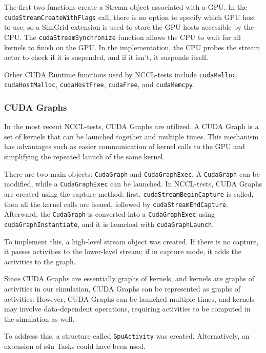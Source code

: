 \documentclass[11pt,a4paper]{article}
\begin{document}
The first two functions create a Stream object associated with a GPU. In the 
\texttt{cudaStreamCreateWithFlags} call, there is no option to specify which 
GPU \gls{host} to use, so a SimGrid extension is used to store the GPU \glspl{host} 
accessible by the CPU. The \texttt{cudaStreamSynchronize} function allows the CPU 
to wait for all kernels to finish on the GPU. In the implementation, the CPU probes 
the stream actor to check if it is suspended, and if it isn't, it suspends itself.

Other CUDA Runtime functions used by NCCL-tests include \texttt{cudaMalloc}, 
\texttt{cudaHostMalloc}, \texttt{cudaHostFree}, \texttt{cudaFree}, and \texttt{cudaMemcpy}.

\subsubsection{CUDA Graphs}
In the most recent NCCL-tests, CUDA Graphs are utilized. A CUDA Graph is a set 
of kernels that can be launched together and multiple times. This mechanism has 
advantages such as easier communication of kernel calls to the GPU and simplifying 
the repeated launch of the same kernel.

There are two main objects: \texttt{CudaGraph} and \texttt{CudaGraphExec}. A 
\texttt{CudaGraph} can be modified, while a \texttt{CudaGraphExec} can be launched. 
In NCCL-tests, CUDA Graphs are created using the capture method: first, 
\texttt{cudaStreamBeginCapture} is called, then all the kernel calls are issued, 
followed by \texttt{cudaStreamEndCapture}. Afterward, the \texttt{CudaGraph} is 
converted into a \texttt{CudaGraphExec} using \texttt{cudaGraphInstantiate}, and 
it is launched with \texttt{cudaGraphLaunch}.

To implement this, a high-level stream object was created. If there is no capture, 
it passes activities to the lower-level stream; if in capture mode, it adds the 
activities to the graph.

Since CUDA Graphs are essentially graphs of kernels, and kernels are graphs of 
activities in our simulation, CUDA Graphs can be represented as graphs of activities. 
However, CUDA Graphs can be launched multiple times, and kernels may involve 
data-dependent operations, requiring activities to be computed in the simulation as well.

To address this, a structure called \texttt{GpuActivity} was created. Alternatively, 
an extension of s4u Tasks could have been used.
\end{document}
